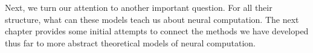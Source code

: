 Next, we turn our attention
to another important question. For all their structure, what can these
models teach us about neural computation. The next chapter provides some
initial attempts to connect the methods we have developed thus far to more
abstract theoretical models of neural computation. 

